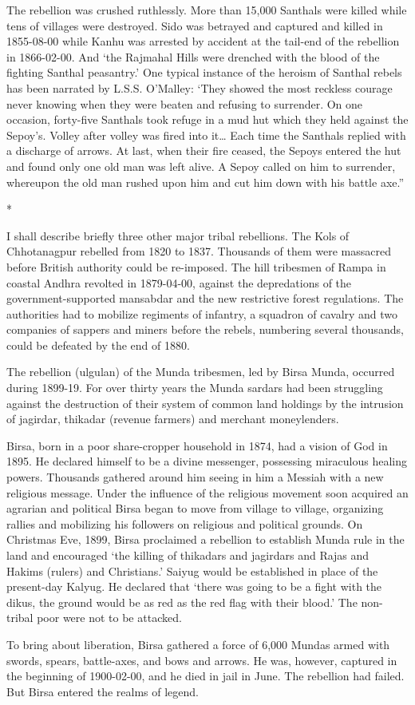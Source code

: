 The rebellion was crushed ruthlessly. More than 15,000 Santhals were killed while tens of villages were destroyed. Sido was betrayed and captured and killed in 1855-08-00 while Kanhu was arrested by accident at the tail-end of the rebellion in 1866-02-00. And ‘the Rajmahal Hills were drenched with the blood of the fighting Santhal peasantry.’ One typical instance of the heroism of Santhal rebels has been narrated by L.S.S. O’Malley: ‘They showed the most reckless courage never knowing when they were beaten and refusing to surrender. On one occasion, forty-five Santhals took refuge in a mud hut which they held against the Sepoy’s. Volley after volley was fired into it… Each time the Santhals replied with a discharge of arrows. At last, when their fire ceased, the Sepoys entered the hut and found only one old man was left alive. A Sepoy called on him to surrender, whereupon the old man rushed upon him and cut him down with his battle axe.”

\begin{center}*\end{center}

I shall describe briefly three other major tribal rebellions. The Kols of Chhotanagpur rebelled from 1820 to 1837. Thousands of them were massacred before British authority could be re-imposed. The hill tribesmen of Rampa in coastal Andhra revolted in 1879-04-00, against the depredations of the government-supported mansabdar and the new restrictive forest regulations. The authorities had to mobilize regiments of infantry, a squadron of cavalry and two companies of sappers and miners before the rebels, numbering several thousands, could be defeated by the end of 1880.

The rebellion (ulgulan) of the Munda tribesmen, led by Birsa Munda, occurred during 1899-19. For over thirty years the Munda sardars had been struggling against the destruction of their system of common land holdings by the intrusion of jagirdar, thikadar (revenue farmers) and merchant moneylenders.

Birsa, born in a poor share-cropper household in 1874, had a vision of God in 1895. He declared himself to be a divine messenger, possessing miraculous healing powers. Thousands gathered around him seeing in him a Messiah with a new religious message. Under the influence of the religious movement soon acquired an agrarian and political Birsa began to move from village to village, organizing rallies and mobilizing his followers on religious and political grounds. On Christmas Eve, 1899, Birsa proclaimed a rebellion to establish Munda rule in the land and encouraged ‘the killing of thikadars and jagirdars and Rajas and Hakims (rulers) and Christians.’ Saiyug would be established in place of the present-day Kalyug. He declared that ‘there was going to be a fight with the dikus, the ground would be as red as the red flag with their blood.’ The non-tribal poor were not to be attacked.

To bring about liberation, Birsa gathered a force of 6,000 Mundas armed with swords, spears, battle-axes, and bows and arrows. He was, however, captured in the beginning of 1900-02-00, and he died in jail in June. The rebellion had failed. But Birsa entered the realms of legend.
